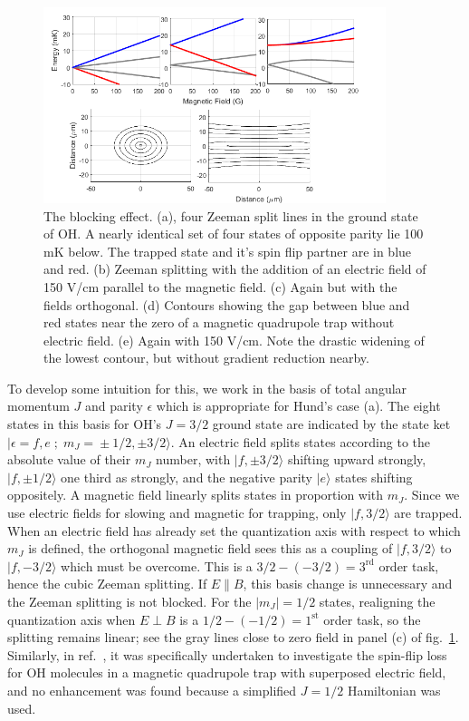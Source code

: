 \documentclass[%
 reprint,
 amsmath,amssymb,
 aps,
prl,
]{revtex4-1}
\begin{document}
\begin{figure}
\includegraphics[width=100mm]{blocking.png}%
\caption{
The blocking effect. (a), four Zeeman split lines in the ground state of OH. A nearly identical set of four states of opposite parity lie 100 mK below. The trapped state and it's spin flip partner are in blue and red. (b) Zeeman splitting with the addition of an electric field of 150 V/cm parallel to the magnetic field. (c) Again but with the fields orthogonal. (d) Contours showing the gap between blue and red states near the zero of a magnetic quadrupole trap without electric field. (e) Again with 150 V/cm. Note the drastic widening of the lowest contour, but without gradient reduction nearby.
\label{fig:blocking}}
\end{figure}

To develop some intuition for this, we work in the basis of total angular momentum $J$ and parity $\epsilon$ which is appropriate for Hund's case (a). The eight states in this basis for OH's $J=3/2$ ground state are indicated by the state ket $|\epsilon\!=\!f,e\;;\;m_J\!=\!\pm1/2,\pm3/2\rangle$. An electric field splits states according to the absolute value of their $m_J$ number, with $|f,\pm3/2\rangle$ shifting upward strongly, $|f,\pm1/2\rangle$ one third as strongly, and the negative parity $|e\rangle$ states shifting oppositely. A magnetic field linearly splits states in proportion with $m_J$. Since we use electric fields for slowing and magnetic for trapping, only $|f,3/2\rangle$ are trapped. When an electric field has already set the quantization axis with respect to which $m_J$ is defined, the orthogonal magnetic field sees this as a coupling of $|f,3/2\rangle$ to $|f,-3/2\rangle$ which must be overcome. This is a $3/2-(-3/2)=3^\text{rd}$ order task, hence the cubic Zeeman splitting. If $E\parallel B$, this basis change is unnecessary and the Zeeman splitting is not blocked. For the $|m_J|=1/2$ states, realigning the quantization axis when $E\!\perp\! B$ is a $1/2-(-1/2)=1^\text{st}$ order task, so the splitting remains linear; see the gray lines close to zero field in panel (c) of fig.~\ref{fig:blocking}. Similarly, in ref.~\cite{Lara2008}, it was specifically undertaken to investigate the spin-flip loss for OH molecules in a magnetic quadrupole trap with superposed electric field, and no enhancement was found because a simplified $J=1/2$ Hamiltonian was used.
\end{document}

